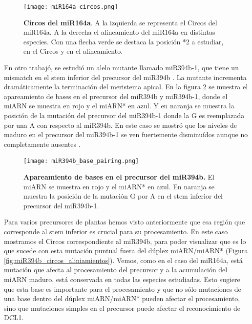     \begin{figure}[htbp!] 
        \centering    
        \texttt{[image: miR164a\_circos.png]}
        \caption[Circos del miR164a]{
			\textbf{Circos del miR164a}.
			A la izquierda se representa el Circos del miR164a.
			A la derecha el alineamiento del miR164a en distintas especies. 
			Con una flecha verde se destaca la posición *2 a estudiar, en el Circos y en el alineamiento.
        }
        \label{fig:miR164a_circos}
    \end{figure}

En otro trabajó, se estudió un alelo mutante llamado miR394b-1, que tiene un mismatch en el stem inferior del precursor del miR394b \citep{pmid23333352}.
La mutante incrementa dramáticamente la terminación del meristema apical.   
En la figura \ref{fig:miR164_base_pairing} se muestra el apareamiento de bases en el precursor del miR394b y miR394b-1, donde el miARN se muestra en rojo y el miARN* en azul.
Y en naranja se muestra la posición de la mutación del precursor del miR394b-1 donde la G es reemplazada por una A con respecto al miR394b.
En este caso se mostró que los niveles de maduro en el precursor del miR394b-1 se ven fuertemente disminuídos aunque no completamente ausentes \citep{pmid23333352}. 

\begin{figure}[htbp!] 
	\centering    
	\texttt{[image: miR394b\_base\_pairing.png]}
	\caption[Apareamiento de bases en el precursor del miR394b]{
		\textbf{Apareamiento de bases en el precursor del miR394b.}
		El miARN se muestra en rojo y el miARN* en azul.
		En naranja se muestra la posición de la mutación G por A en el stem inferior del precursor del miR394b-1.
	}
	\label{fig:miR164_base_pairing}
\end{figure}

Para varios precursores de plantas hemos visto anteriormente que esa región que corresponde al stem inferior es crucial para su procesamiento.
En este caso mostramos el Circos correspondiente al miR394b, para poder visualizar que es lo que sucede con esta mutación puntual fuera del dúplex miARN/miARN* (Figura \ref{fig:miR394b_circos_aliniamientos}).
Vemos, como en el caso del miR164a, está mutación que afecta al procesamiento del precursor y a la acumulación del miARN maduro, está conservada en todas las especies estudiadas.
Esto sugiere que esta base es importante para el procesamiento y que no sólo mutaciones de una base dentro del dúplex miARN/miARN* pueden afectar el procesamiento, sino que mutaciones simples en el precursor puede afectar el reconocimiento de DCL1. 

